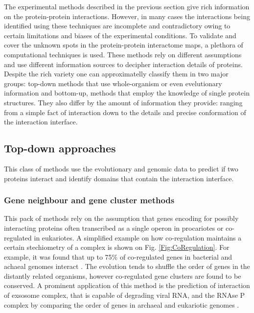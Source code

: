 The experimental methods described in the previous section give rich information on the protein-protein interactions. However, in many cases
the interactions being identified using these techniques are incomplete and contradictory owing to certain limitations and biases of the
experimental conditions. To validate and cover the unknown spots in the protein-protein interactome maps, a plethora of computational
techniques is used. These methods rely on different assumptions and use different information sources to decipher interaction details 
of proteins. Despite the rich variety one can approximatelly classify them in two major groups: top-down methods that use whole-organism or even
evelutionary information and bottom-up, methods that employ the knowledge of single protein structures. They also differ by the amount of information
they provide: ranging from a simple fact of interaction down to the details and precise conformation of the interaction interface.

\subsection{Top-down approaches}
This class of methods use the evolutionary and genomic data to predict if two proteins interact and identify domains that contain the interaction interface.

\subsubsection{Gene neighbour and gene cluster methods}
This pack of methods rely on the assumption that genes encoding for possibly interacting proteins often transcribed as a single operon in procariotes
or co-regulated in eukariotes. A simplified example on how co-regulation maintains a certain stechiometry of a complex is shown on Fig. \ref{Fig:CoRegulation}.
For example, it was found that up to 75\% of co-regulated genes in bacterial and achaeal genomes interact \cite{dandekar1998conservation}.
The evolution tends to shuffle the order of genes in the distantly related organisms, however co-regulated gene clusters are found to be conserved. 
A prominent application of this method is the prediction of interaction of exsosome complex, that is capable of degrading viral RNA, and the RNAse P complex
by comparing the order of genes in archaeal and eukariotic genomes \cite{koonin2001prediction}.

